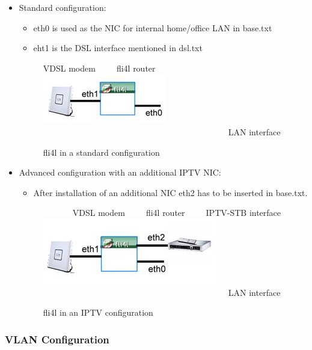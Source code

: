 \begin{itemize}
   \item{Standard configuration:
         \begin{itemize}
            \item{eth0 is used as the NIC for internal home/office LAN in base.txt}
            \item{eht1 is the DSL interface mentioned in dsl.txt}
         \end{itemize}
         \begin{figure}[ht!]
         \centering
         \selectfont VDSL modem~~~~~fli4l router~~~~~~~~~~~~~~~~\\
         \includegraphics[]{image001}\\
         ~~~~~~~~~~~~~~~~~~~~~~~~~~~~~~~~~~~~~~~~~~~~LAN interface
         \caption{fli4l in a standard configuration}
         \label{fig:standardconfig}
         \end{figure}
      }
   \item{Advanced configuration with an additional IPTV NIC:
         \begin{itemize}
            \item{After installation of an additional NIC eth2 has to be inserted in base.txt.}
         \end{itemize}
         \begin{figure}[ht!]
         \centering
         \selectfont ~~~~~~~VDSL modem~~~~~fli4l router~~~~~IPTV-STB interface\\
         \includegraphics[]{image002}\\
         ~~~~~~~~~~~~~~~~~~~~~~~~~~~~~~~~~~~~~~~~~~~~LAN interface
         \caption{fli4l in an IPTV configuration}
         \label{fig:iptvconfig}
         \end{figure}
      }
\end{itemize}


\subsubsection{VLAN Configuration}

